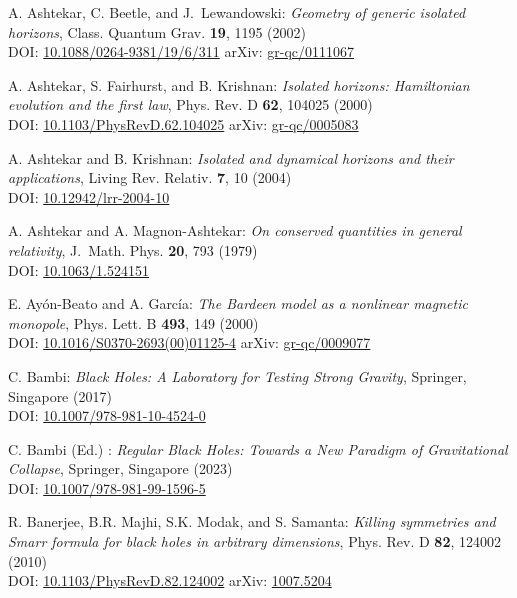\begin{thebibliography}{123}
A. Ashtekar, C. Beetle, and J.~Lewandowski:
{\em Geometry of generic isolated horizons},
Class. Quantum Grav. {\bf 19}, 1195 (2002)\\
DOI: \href{https://doi.org/10.1088/0264-9381/19/6/311}{10.1088/0264-9381/19/6/311}\hfill
arXiv: \href{https://arxiv.org/abs/gr-qc/0111067}{gr-qc/0111067}

A. Ashtekar, S. Fairhurst, and B. Krishnan:
{\em Isolated horizons: Hamiltonian evolution and the first law},
Phys. Rev. D {\bf 62}, 104025 (2000)\\
DOI: \href{https://doi.org/10.1103/PhysRevD.62.104025}{10.1103/PhysRevD.62.104025}\hfill
arXiv: \href{https://arxiv.org/abs/gr-qc/0005083}{gr-qc/0005083}

A. Ashtekar and B. Krishnan: {\em Isolated and dynamical horizons
and their applications},
Living Rev. Relativ. {\bf 7}, 10 (2004)\\
DOI: \href{https://doi.org/10.12942/lrr-2004-10}{10.12942/lrr-2004-10}

A. Ashtekar and A. Magnon-Ashtekar:
{\em On conserved quantities in general relativity},
J.~Math. Phys. {\bf 20}, 793 (1979)\\
DOI: \href{https://doi.org/10.1063/1.524151}{10.1063/1.524151}

E. Ayón-Beato and A. García:
{\em The Bardeen model as a nonlinear magnetic monopole},
Phys. Lett. B {\bf 493}, 149 (2000)\\
DOI: \href{https://doi.org/10.1016/S0370-2693(00)01125-4}{10.1016/S0370-2693(00)01125-4}\hfill
arXiv: \href{https://arxiv.org/abs/gr-qc/0009077}{gr-qc/0009077}

C. Bambi: {\em Black Holes: A Laboratory for Testing Strong Gravity},
Springer, Singapore (2017)\\
DOI: \href{https://doi.org/10.1007/978-981-10-4524-0}{10.1007/978-981-10-4524-0}

C. Bambi (Ed.) : {\em Regular Black Holes: Towards a New Paradigm of Gravitational Collapse},
Springer, Singapore (2023)\\
DOI: \href{https://doi.org/10.1007/978-981-99-1596-5}{10.1007/978-981-99-1596-5}

R. Banerjee, B.R. Majhi, S.K. Modak, and S. Samanta:
{\em Killing symmetries and Smarr formula for black holes in arbitrary dimensions},
Phys. Rev. D {\bf 82}, 124002 (2010)\\
DOI: \href{https://doi.org/10.1103/PhysRevD.82.124002}{10.1103/PhysRevD.82.124002}\hfill
arXiv: \href{https://arxiv.org/abs/1007.5204}{1007.5204}


\end{thebibliography}
